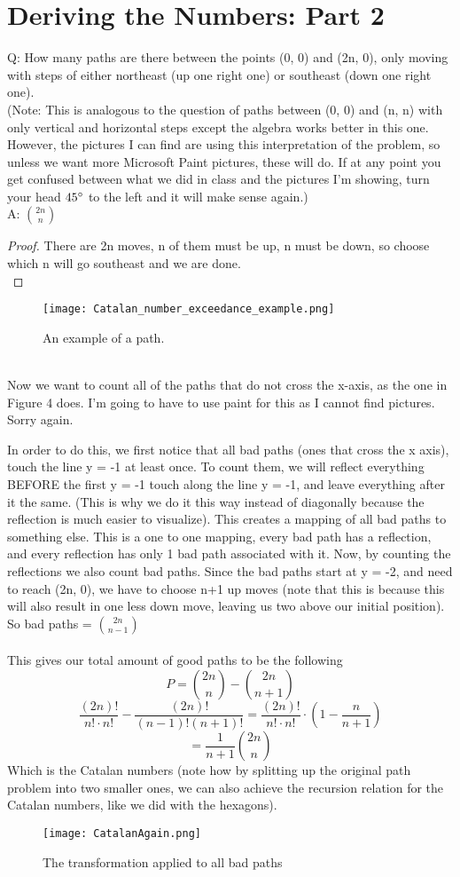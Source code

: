 \documentclass[11pt,twosided]{article}
\begin{document}
\section{Deriving the Numbers: Part 2}
Q: How many paths are there between the points (0, 0) and (2n, 0), only moving with steps of either northeast (up one right one) or southeast (down one right one).\\ (Note: This is analogous to the question of paths between (0, 0) and (n, n) with only vertical and horizontal steps except the algebra works better in this one. However, the pictures I can find are using this interpretation of the problem, so unless we want more Microsoft Paint pictures, these will do. If at any point you get confused between what we did in class and the pictures I'm showing, turn your head $45\degree$ to the left and it will make sense again.)\\
A: ${2n \choose n}$\\
\begin{proof}
    There are 2n moves, n of them must be up, n must be down, so choose which n will go southeast and we are done.\\
\end{proof}

\begin{figure}[h]
    \texttt{[image: Catalan\_number\_exceedance\_example.png]}
    \caption{An example of a path.}
     \label{fig:hex1}
\end{figure}\\

Now we want to count all of the paths that do not cross the x-axis, as the one in Figure 4 does. I'm going to have to use paint for this as I cannot find pictures. Sorry again. 

In order to do this, we first notice that all bad paths (ones that cross the x axis), touch the line y = -1 at least once. To count them, we will reflect everything BEFORE the first y = -1 touch along the line y = -1, and leave everything after it the same. (This is why we do it this way instead of diagonally because the reflection is much easier to visualize). This creates a mapping of all bad paths to something else. This is a one to one mapping, every bad path has a reflection, and every reflection has only 1 bad path associated with it. Now, by counting the reflections we also count bad paths. Since the bad paths start at y = -2, and need to reach (2n, 0), we have to choose n+1 up moves (note that this is because this will also result in one less down move, leaving us two above our initial position). \\So bad paths = ${2n \choose n-1}$
\\
\\
This gives our total amount of good paths to be the following $$P = {2n \choose n} - {2n \choose n+1}$$ $$\frac{(2n)!}{n!\cdot n!}-\frac{(2n)!}{(n-1)!(n+1)!} = \frac{(2n)!}{n!\cdot n!} \cdot(1-\frac{n}{n+1})$$
$$= \frac{1}{n+1}{2n \choose n}$$
Which is the Catalan numbers (note how by splitting up the original path problem into two smaller ones, we can also achieve the recursion relation for the Catalan numbers, like we did with the hexagons).

\begin{figure}[h]
    \texttt{[image: CatalanAgain.png]}
    \caption{The transformation applied to all bad paths}
     \label{fig:hex1}
\end{figure}\\
\end{document}
